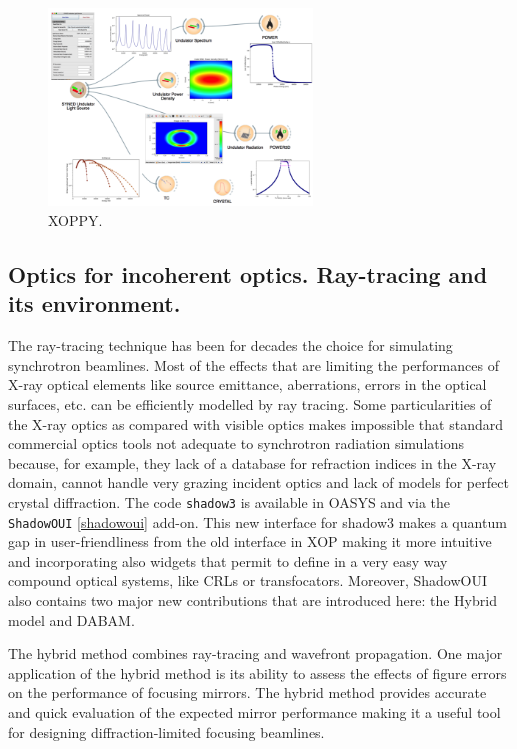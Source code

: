 \documentclass{aip-cp}
\begin{document}
\begin{figure}[hh]
\includegraphics[width=7cm]{FIGURES/xoppy}
\caption{XOPPY.}
\label{figXoppy}
\end{figure}

\subsection{Optics for incoherent optics. Ray-tracing and its environment.}

The ray-tracing technique has been for decades the choice for simulating synchrotron beamlines. Most of the effects that are limiting the performances of X-ray optical elements like source emittance, aberrations, errors in the optical surfaces, etc. can be efficiently modelled by ray tracing. Some particularities of the X-ray optics as compared with visible optics makes impossible that standard commercial optics tools not adequate to synchrotron radiation simulations because, for example, they lack of  a database for refraction indices in the X-ray domain, cannot handle very grazing incident optics and lack of models for perfect crystal diffraction. The code {\tt shadow3} \cite{shadow3} is available in OASYS and via the {\tt ShadowOUI} \ref{shadowoui} add-on. This new interface for shadow3 makes a quantum gap in user-friendliness from the old interface in XOP making it more intuitive and incorporating also widgets that permit to define in a very easy way compound optical systems, like CRLs or transfocators. Moreover, ShadowOUI also contains two major new contributions that are introduced here: the Hybrid model and DABAM.

The hybrid method \cite{hybrid} combines ray-tracing and wavefront propagation. One major application of the hybrid method is its ability to assess the effects of figure errors on the performance of focusing mirrors. The hybrid method provides accurate and quick evaluation of the expected mirror performance making it a useful tool for designing diffraction-limited focusing beamlines.
\end{document}
